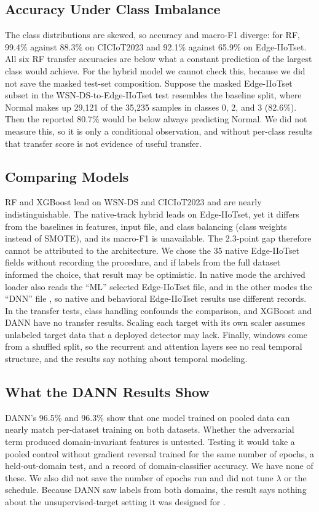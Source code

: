 \documentclass[conference]{IEEEtran}
\begin{document}
\subsection{Accuracy Under Class Imbalance}
The class distributions are skewed, so accuracy and macro-F1 diverge: for RF, 99.4\% against 88.3\% on CICIoT2023 and 92.1\% against 65.9\% on Edge-IIoTset. All six RF transfer accuracies are below what a constant prediction of the largest class would achieve. For the hybrid model we cannot check this, because we did not save the masked test-set composition. Suppose the masked Edge-IIoTset subset in the WSN-DS-to-Edge-IIoTset test resembles the baseline split, where Normal makes up 29{,}121 of the 35{,}235 samples in classes 0, 2, and 3 (82.6\%). Then the reported 80.7\% would be below always predicting Normal. We did not measure this, so it is only a conditional observation, and without per-class results that transfer score is not evidence of useful transfer.

\subsection{Comparing Models}
RF and XGBoost lead on WSN-DS and CICIoT2023 and are nearly indistinguishable. The native-track hybrid leads on Edge-IIoTset, yet it differs from the baselines in features, input file, and class balancing (class weights instead of SMOTE), and its macro-F1 is unavailable. The 2.3-point gap therefore cannot be attributed to the architecture. We chose the 35 native Edge-IIoTset fields without recording the procedure, and if labels from the full dataset informed the choice, that result may be optimistic. In native mode the archived loader also reads the ``ML'' selected Edge-IIoTset file, and in the other modes the ``DNN'' file \cite{ferrag2022}, so native and behavioral Edge-IIoTset results use different records. In the transfer tests, class handling confounds the comparison, and XGBoost and DANN have no transfer results. Scaling each target with its own scaler assumes unlabeled target data that a deployed detector may lack. Finally, windows come from a shuffled split, so the recurrent and attention layers see no real temporal structure, and the results say nothing about temporal modeling.

\subsection{What the DANN Results Show}
DANN's 96.5\% and 96.3\% show that one model trained on pooled data can nearly match per-dataset training on both datasets. Whether the adversarial term produced domain-invariant features is untested. Testing it would take a pooled control without gradient reversal trained for the same number of epochs, a held-out-domain test, and a record of domain-classifier accuracy. We have none of these. We also did not save the number of epochs run and did not tune $\lambda$ or the schedule. Because DANN saw labels from both domains, the result says nothing about the unsupervised-target setting it was designed for \cite{ganin2016}.
\end{document}
